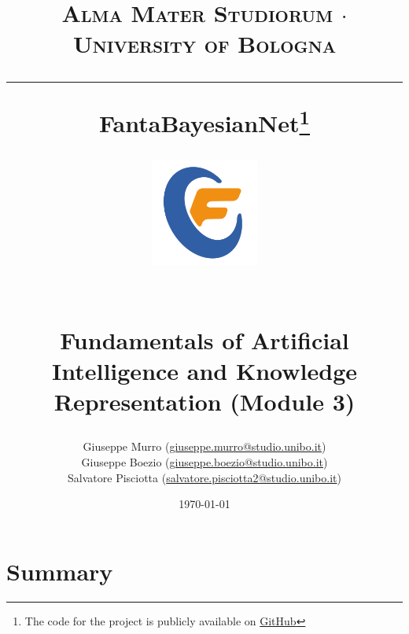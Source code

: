 \documentclass[a4paper,10pt]{report}
\begin{document}
\frenchspacing



\title{
  {{\large{\textsc{Alma Mater Studiorum $\cdot$ University of Bologna}}}}
  \rule{\textwidth}{0.4pt}\vspace{3mm}
  \textbf{FantaBayesianNet\footnote{The code for the project is publicly available on \href{https://github.com/giuseppeboezio/FantaBayesianNet}{GitHub}}}
  \begin{figure}[!htb]
    \centering
    \includegraphics[width = 100pt]{fantacalcio-icon}
  \end{figure} \\
  Fundamentals of Artificial Intelligence and Knowledge Representation (Module 3)
}

\author{ Giuseppe Murro (\href{mailto:giuseppe.murro@studio.unibo.it}{giuseppe.murro@studio.unibo.it}) \\ Giuseppe Boezio (\href{mailto:giuseppe.boezio@studio.unibo.it}{giuseppe.boezio@studio.unibo.it}) \\ Salvatore Pisciotta (\href{mailto:salvatore.pisciotta2@studio.unibo.it}{salvatore.pisciotta2@studio.unibo.it})}
\date{\today}
\maketitle
\newpage
\tableofcontents
\setcounter{tocdepth}{1}
\newpage



\chapter{Summary}\label{chap:introduction}
\end{document}
